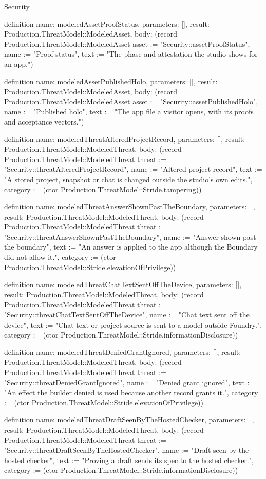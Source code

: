 \begin{lexlean}{Security}
\begin{semanticmodule}
definition{
  name: modeledAssetProofStatus,
  parameters: [],
  result: Production.ThreatModel::ModeledAsset,
  body: (record Production.ThreatModel::ModeledAsset {asset := "Security::assetProofStatus", name := "Proof status", text := "The phase and attestation the studio shows for an app."})
}

definition{
  name: modeledAssetPublishedHolo,
  parameters: [],
  result: Production.ThreatModel::ModeledAsset,
  body: (record Production.ThreatModel::ModeledAsset {asset := "Security::assetPublishedHolo", name := "Published holo", text := "The app file a visitor opens, with its proofs and acceptance vectors."})
}

definition{
  name: modeledThreatAlteredProjectRecord,
  parameters: [],
  result: Production.ThreatModel::ModeledThreat,
  body: (record Production.ThreatModel::ModeledThreat {threat := "Security::threatAlteredProjectRecord", name := "Altered project record", text := "A stored project, snapshot or chat is changed outside the studio's own edits.", category := (ctor Production.ThreatModel::Stride.tampering)})
}

definition{
  name: modeledThreatAnswerShownPastTheBoundary,
  parameters: [],
  result: Production.ThreatModel::ModeledThreat,
  body: (record Production.ThreatModel::ModeledThreat {threat := "Security::threatAnswerShownPastTheBoundary", name := "Answer shown past the boundary", text := "An answer is applied to the app although the Boundary did not allow it.", category := (ctor Production.ThreatModel::Stride.elevationOfPrivilege)})
}

definition{
  name: modeledThreatChatTextSentOffTheDevice,
  parameters: [],
  result: Production.ThreatModel::ModeledThreat,
  body: (record Production.ThreatModel::ModeledThreat {threat := "Security::threatChatTextSentOffTheDevice", name := "Chat text sent off the device", text := "Chat text or project source is sent to a model outside Foundry.", category := (ctor Production.ThreatModel::Stride.informationDisclosure)})
}

definition{
  name: modeledThreatDeniedGrantIgnored,
  parameters: [],
  result: Production.ThreatModel::ModeledThreat,
  body: (record Production.ThreatModel::ModeledThreat {threat := "Security::threatDeniedGrantIgnored", name := "Denied grant ignored", text := "An effect the builder denied is used because another record grants it.", category := (ctor Production.ThreatModel::Stride.elevationOfPrivilege)})
}

definition{
  name: modeledThreatDraftSeenByTheHostedChecker,
  parameters: [],
  result: Production.ThreatModel::ModeledThreat,
  body: (record Production.ThreatModel::ModeledThreat {threat := "Security::threatDraftSeenByTheHostedChecker", name := "Draft seen by the hosted checker", text := "Proving a draft sends its spec to the hosted checker.", category := (ctor Production.ThreatModel::Stride.informationDisclosure)})
}


\end{semanticmodule}
\end{lexlean}
